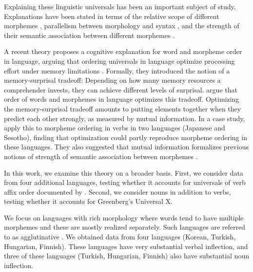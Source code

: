 \documentclass[11pt,letterpaper]{article}
\begin{document}
Explaining these linguistic universals has been an important subject of study.
Explanations have been stated in terms of the relative scope of different morphemes  \citep{rice2000morpheme}, parallelism between morphology and syntax \citep{givon1971historical,venneman1973explanation,baker1985the}, and the strength of their semantic association between different morphemes \citep{bybee-morphology-1985}.

A recent theory proposes a cognitive explanation for word and morpheme order in language, arguing that ordering universals in language optimize processing effort under memory limitations \citep{Hahn2020modeling}.
Formally, they introduced the notion of a memory-surprisal tradeoff: Depending on how many memory resources a comprehender invests, they can achieve different levels of surprisal.
\citep{Hahn2020modeling} argue that order of words and morphemes in language optimizes this tradeoff.
Optimizing the memory-surprisal tradeoff amounts to putting elements together when they predict each other strongly, as measured by mutual information.
In a case study, \citep{Hahn2020modeling} apply this to morpheme ordering in verbs in two languages (Japanese and Sesotho), finding that optimization could partly reproduce morpheme ordering in these languages.
They also suggested that mutual information formalizes previous notions of strength of semantic association between morphemes \citep{bybee-morphology-1985}. %






In this work, we examine this theory on a broader basis.
First, we consider data from four additional languages, testing whether it accounts for universals of verb affix order documented by \cite{bybee-morphology-1985}.
Second, we consider nouns in addition to verbs, testing whether it accounts for Greenberg's Universal X.

We focus on languages with rich morphology where words tend to have multiple morphemes and these are mostly realized separately.
Such languages are referred to as agglutinative \cite{humboldt1836uber,greenberg1960a}.
We obtained data from four languages (Korean, Turkish, Hungarian, Finnish).
These languages have very substantial verbal inflection, and three of these languages (Turkish, Hungarian, Finnish) also have substantial noun inflection.
\end{document}
